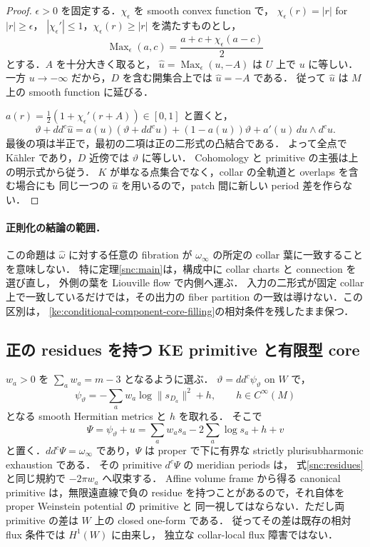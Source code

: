 \begin{proof}
$\epsilon>0$ を固定する．$\chi_\epsilon$ を smooth convex function で，
$\chi_\epsilon(r)=|r|$ for $|r|\ge\epsilon$，
$|\chi_\epsilon'|\le1$，$\chi_\epsilon(r)\ge|r|$ を満たすものとし，
\[
 \operatorname{Max}_\epsilon(a,c)
 =\frac{a+c+\chi_\epsilon(a-c)}2
\]
とする．$A$ を十分大きく取ると，
$\widehat u=\operatorname{Max}_\epsilon(u,-A)$ は $U$ 上で $u$ に等しい．
一方 $u\to-\infty$ だから，$D$ を含む開集合上では $\widehat u=-A$ である．
従って $\widehat u$ は $M$ 上の smooth function に延びる．

$a(r)=\tfrac12(1+\chi_\epsilon'(r+A))\in[0,1]$ と置くと，
\[
 \vartheta+dd^c\widehat u
  =a(u)(\vartheta+dd^cu)+(1-a(u))\vartheta
    +a'(u)\,du\wedge d^cu.
\]
最後の項は半正で，最初の二項は正の二形式の凸結合である．
よって全点で K\"ahler であり，$D$ 近傍では $\vartheta$ に等しい．
Cohomology と primitive の主張は上の明示式から従う．
$K$ が単なる点集合でなく，collar の全軌道と overlaps を含む場合にも
同じ一つの $\widehat u$ を用いるので，patch 間に新しい period 差を作らない．
\end{proof}

\paragraph{正則化の結論の範囲．}
この命題は $\widehat\omega$ に対する任意の fibration が
$\omega_\infty$ の所定の collar 葉に一致することを意味しない．
特に定理\ref{snc:main}は，構成中に collar charts と connection を選び直し，
外側の葉を Liouville flow で内側へ運ぶ．
入力の二形式が固定 collar 上で一致しているだけでは，その出力の
fiber partition の一致は導けない．この区別は，
\ref{ke:conditional-component-core-filling}の相対条件を残したまま保つ．

\subsection{正の residues を持つ KE primitive と有限型 core}

$w_a>0$ を $\sum_aw_a=m-3$ となるように選ぶ．
$\vartheta=dd^c\psi_\vartheta$ on $W$ で，
\[
 \psi_\vartheta=-\sum_aw_a\log\|s_{D_a}\|^2+h,
 \qquad h\in C^\infty(M)
\]
となる smooth Hermitian metrics と $h$ を取れる．
そこで
\begin{equation}\label{ke:eq:positive-residue-ke-potential}
 \Psi=\psi_\vartheta+u
      =\sum_aw_as_a-2\sum_a\log s_a+h+v
\end{equation}
と置く．$dd^c\Psi=\omega_\infty$ であり，$\Psi$ は proper で下に有界な
strictly plurisubharmonic exhaustion である．
その primitive $d^c\Psi$ の meridian periods は，
式\eqref{snc:residues}と同じ規約で $-2\pi w_a$ へ収束する．
Affine volume frame から得る canonical primitive は，無限遠直線で負の residue
を持つことがあるので，それ自体を proper Weinstein potential の primitive と
同一視してはならない．ただし両 primitive の差は $W$ 上の closed one-form である．
従ってその差は既存の相対 flux 条件では $H^1(W)$ に由来し，
独立な collar-local flux 障害ではない．

